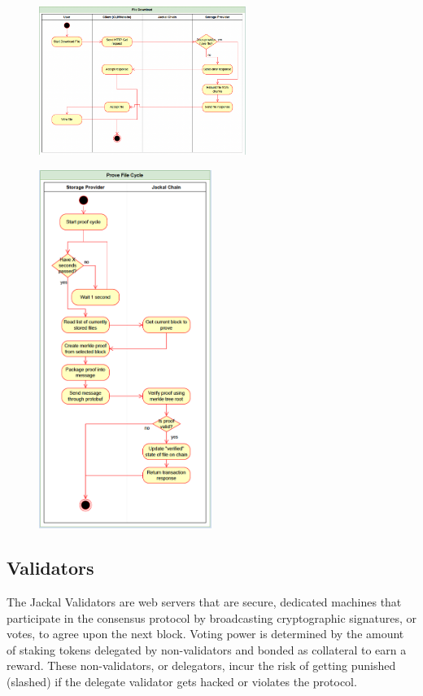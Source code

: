 \documentclass[a4paper]{article}
\begin{document}
\begin{figure}[!htbp]
\centering
\includegraphics[width=0.6\textwidth]{assets/providers3.png}
\end{figure}

\begin{figure}[!htbp]
\centering
\includegraphics[width=0.5\textwidth]{assets/providers4.png}
\end{figure}

\newpage
\subsection{Validators}
The Jackal Validators are web servers that are secure, dedicated machines that participate in the consensus protocol by broadcasting cryptographic signatures, or votes, to agree upon the next block. Voting power is determined by the amount of staking tokens delegated by non-validators and bonded as collateral to earn a reward. These non-validators, or delegators, incur the risk of getting punished (slashed) if the delegate validator gets hacked or violates the protocol.
\end{document}

